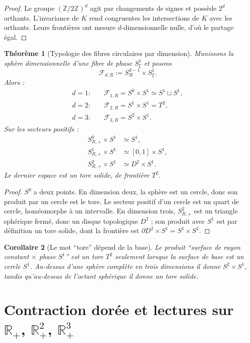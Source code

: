 \documentclass[11pt,a4paper]{article}
\newtheorem{theorem}{Théorème}[section]
\newtheorem{corollary}[theorem]{Corollaire}
\newcommand{\R}{\mathbb R}
\newcommand{\Z}{\mathbb Z}
\newcommand{\Rp}{\mathbb R_{+}}
\begin{document}
\begin{proof}
Le groupe $(\Z/2\Z)^d$ agit par changements de signes et possède $2^d$ orthants. L'invariance de $K$ rend congruentes les intersections de $K$ avec les orthants. Leurs frontières ont mesure $d$-dimensionnelle nulle, d'où le partage égal.
\end{proof}

\begin{theorem}[Typologie des fibres circulaires par dimension]\label{thm:fibre-dim}
Munissons la sphère dimensionnelle d'une fibre de phase $S^1_\xi$ et posons
\[
 \mathcal F_{d,R}:=S_R^{d-1}\times S^1_\xi.
\]
Alors :
\begin{align*}
 d=1:&\quad \mathcal F_{1,R}=S^0\times S^1\simeq S^1\sqcup S^1,\\
 d=2:&\quad \mathcal F_{2,R}=S^1\times S^1=T^2,\\
 d=3:&\quad \mathcal F_{3,R}=S^2\times S^1.
\end{align*}
Sur les secteurs positifs :
\begin{align*}
 S^0_{R,+}\times S^1&\simeq S^1,\\
 S^1_{R,+}\times S^1&\simeq [0,1]\times S^1,\\
 S^2_{R,+}\times S^1&\simeq D^2\times S^1.
\end{align*}
Le dernier espace est un tore solide, de frontière $T^2$.
\end{theorem}

\begin{proof}
$S^0$ a deux points. En dimension deux, la sphère est un cercle, donc son produit par un cercle est le tore. Le secteur positif d'un cercle est un quart de cercle, homéomorphe à un intervalle. En dimension trois, $S^2_{R,+}$ est un triangle sphérique fermé, donc un disque topologique $D^2$ ; son produit avec $S^1$ est par définition un tore solide, dont la frontière est $\partial D^2\times S^1=S^1\times S^1$.
\end{proof}

\begin{corollary}[Le mot ``tore'' dépend de la base]
Le produit ``surface de rayon constant $\times$ phase $S^1$'' est un tore $T^2$ seulement lorsque la surface de base est un cercle $S^1$. Au-dessus d'une sphère complète en trois dimensions il donne $S^2\times S^1$, tandis qu'au-dessus de l'octant sphérique il donne un tore solide.
\end{corollary}

\section{Contraction dorée et lectures sur $\R_+$, $\Rp^2$, $\Rp^3$}
\end{document}
